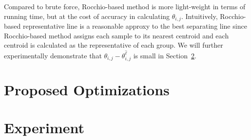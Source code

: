  Compared to brute force, Rocchio-based method is more light-weight in terms of running time, but at the cost of accuracy in calculating $\theta_{i,j}$. Intuitively, Rocchio-based representative line is a reasonable approxy to the best separating line since Rocchio-based method assigns each sample to its nearest centroid and each centroid is calculated as the representative of each group. We will further experimentally demonstrate that $\theta_{i,j}-\theta_{i,j}^{\hat{\ell}}$ is small in Section~\ref{sec:exp}.

\section{Proposed Optimizations}\label{sec:opt}

\section{Experiment}
\label{sec:exp}








